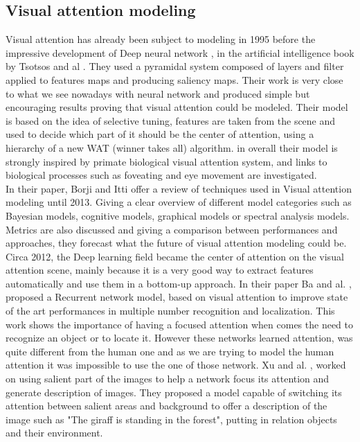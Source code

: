 \subsection{Visual attention modeling}

Visual attention has already been subject to modeling in 1995 before the impressive development of Deep neural network , in the artificial intelligence book by Tsotsos and al \cite{tsotsos1995}.  They used a pyramidal system composed of layers and filter applied to features maps and producing saliency maps. Their work is very close to what we see nowadays with neural network and produced simple but encouraging results proving that visual attention could be modeled. Their model is based on the idea of selective tuning, features are taken from the scene and used to decide which part of it should be the center of attention, using a hierarchy of a new WAT (winner takes all) algorithm. in overall their model is strongly inspired by primate biological visual attention system, and links to biological processes such as foveating and eye movement are investigated.  \\


In their paper, Borji and Itti \cite{Borji} offer a review of techniques used in Visual attention modeling until 2013. Giving a clear overview of  different model categories such as Bayesian models, cognitive models, graphical models or spectral analysis models. Metrics are also discussed and giving a comparison between performances and approaches, they forecast what the future of visual attention modeling could be.
Circa 2012, the Deep learning field\cite{krizhevsky2012imagenet,szegedy2015going,DBLP:journals/corr/MnihKSGAWR13,jia2014caffe,5537907,deng2009imagenet,srivastava2014dropout} became the center of attention on the visual attention scene, mainly because it is a very good way to extract features automatically and use them in a bottom-up approach.
In their paper Ba and al. \cite{BaMK14}, proposed a Recurrent network model, based on visual attention to improve state of the art performances in multiple number recognition and localization. This work shows the importance of having a focused attention when comes the need to recognize an object or to locate it. However these networks learned attention, was quite different from the human one and as we are trying to model the human attention it was impossible to use the one of those network.
Xu and al. \cite{xu2015show}, worked on using salient part of the images to help a network focus its attention and generate description of images. They proposed a model capable of switching its attention between salient areas and background to offer a description of the image such as "The giraff is standing in the forest", putting in relation objects and their environment.


